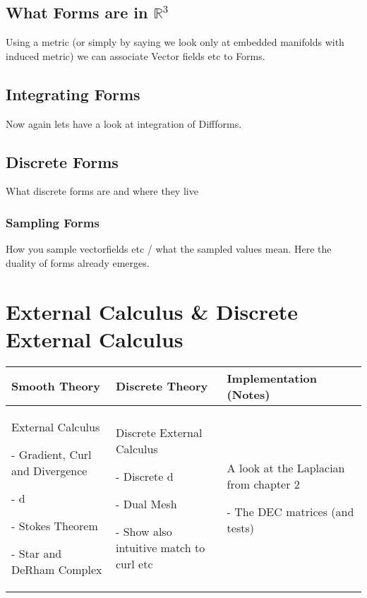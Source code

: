 \documentclass[]{scrbook}
\newenvironment{packed_enum}{
\begin{enumerate}
  \setlength{\itemsep}{1pt}
  \setlength{\parskip}{0pt}
  \setlength{\parsep}{0pt}
}{\end{enumerate}}
\begin{document}
	\subsection{What Forms are in $\mathbb{R}^3$}
		Using a metric (or simply by saying we look only at embedded manifolds with induced metric) we can associate
		Vector fields etc to Forms.
	\subsection{Integrating Forms}
		Now again lets have a look at integration of Diffforms.
	\subsection{Discrete Forms}
		What discrete forms are and where they live
	\subsubsection{Sampling Forms}
		How you sample vectorfields etc / what the sampled values mean. Here the duality of forms already emerges.
	
\newpage		
\section{External Calculus \& Discrete External Calculus}
	\begin{longtable}{|p{4.5cm}|p{4.5cm}|p{4.5cm}|}
		\hline
		Smooth Theory& Discrete Theory& Implementation (Notes)\\
		\hline
			External Calculus
			\begin{packed_enum}
				\item[-] Gradient, Curl and Divergence
				\item[-] d
				\item[-] Stokes Theorem
				\item[-] Star and DeRham Complex
			\end{packed_enum}
			&
			Discrete External Calculus
			\begin{packed_enum}
				\item[-] Discrete d
				\item[-] Dual Mesh
				\item[-] Show also intuitive match to curl etc
			\end{packed_enum}
			 & 
			 A look at the Laplacian from chapter 2
			 \begin{packed_enum}
				\item[-] The DEC matrices (and tests)
			\end{packed_enum}
			 \\		
		\hline
	\end{longtable}
\end{document}
